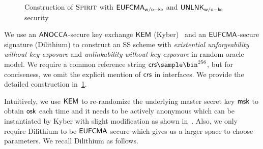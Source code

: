 \begin{figure}[!t]
\begin{pchstack}[boxed]
\begin{pcvstack}
{    }
    \pcvspace
    \end{pcvstack}
    \end{pchstack}
\caption{Construction of $\textsc{Spirit}$ with $\mathsf{EUFCMA}_\mathsf{w/o-ke}$ and $\mathsf{UNLNK}_\mathsf{w/o-ke}$ security}
\label{fig:ss-lattice}
\end{figure}

We use an $\mathsf{ANOCCA}$-secure key exchange $\mathsf{KEM}$ (Kyber)~\cite{NISTPQC-R3:CRYSTALS-KYBER20} and an $\mathsf{EUFCMA}$-secure signature (Dilithium) to construct an SS scheme with \emph{existential unforgeability without key-exposure} and \emph{unlinkability without key-exposure} in random oracle model. We require a common reference string $\crs\sample\bin^{256}$, but for conciseness, we omit the explicit mention of $\mathsf{crs}$ in interfaces. We provide the detailed construction in~\cref{fig:ss-lattice}. 

Intuitively, we use $\mathsf{KEM}$ to re-randomize the underlying master secret key $\mathsf{msk}$ to obtain $\mathsf{osk}$ each time and it needs to be actively anonymous which can be instantiated by Kyber with slight modification as shown in~\cite{EC:GruMarPat22}. Also, we only require Dilithium to be $\mathsf{EUFCMA}$ secure which gives us a larger space to choose parameters.
We recall Dilithium as follows.

